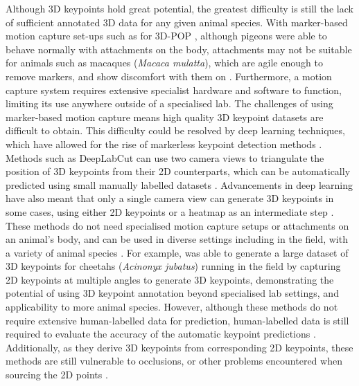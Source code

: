\documentclass[11pt, letterpaper]{article} %
\begin{document}
\noindent Although 3D keypoints hold great potential, the greatest difficulty is still the lack of sufficient annotated 3D data for any given animal species. With marker-based motion capture set-ups such as for 3D-POP \citep{naik_3d-pop_2023}, although pigeons were able to behave normally with attachments on the body, attachments may not be suitable for animals such as macaques (\textit{Macaca mulatta}), which are agile enough to remove markers, and show discomfort with them on \citep{3D_macaque_2020}. Furthermore, a motion capture system requires extensive specialist hardware and software to function, limiting its use anywhere outside of a specialised lab. The challenges of using marker-based motion capture means high quality 3D keypoint datasets are difficult to obtain. 
%
This difficulty could be resolved by deep learning techniques, which have allowed for the rise of markerless keypoint detection methods \citep{deep_mocap_2020, mathis_deeplearning_2020}. Methods such as DeepLabCut \citep{mathis_deeplabcut_2018} can use two camera views to triangulate the position of 3D keypoints from their 2D counterparts, which can be automatically predicted using small manually labelled datasets \citep{deeplabcut_3D_2019}. Advancements in deep learning have also meant that only a single camera view can generate 3D keypoints in some cases, using either 2D keypoints or a heatmap as an intermediate step \citep{liftpose3d_2021, monocular_2022}. These methods do not need specialised motion capture setups or attachments on an animal's body, and can be used in diverse settings including in the field, with a variety of animal species \citep{3D_macaque_2020, joska_acinoset_2021, 3D_monkey_2023}. For example, \citet{joska_acinoset_2021} was able to generate a large dataset of 3D keypoints for cheetahs (\textit{Acinonyx jubatus}) running in the field by capturing 2D keypoints at multiple angles to generate 3D keypoints, demonstrating the potential of using 3D keypoint annotation beyond specialised lab settings, and applicability to more animal species.
%
However, although these methods do not require extensive human-labelled data for prediction, human-labelled data is still required to evaluate the accuracy of the automatic keypoint predictions \citep{waldmann_3d-muppet_2023}. Additionally, as they derive 3D keypoints from corresponding 2D keypoints, these methods are still vulnerable to occlusions, or other problems encountered when sourcing the 2D points \citep{deeplabcut_3D_2019,monocular_2022}.
\end{document}
